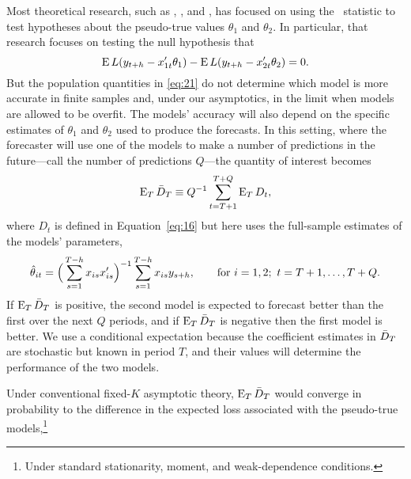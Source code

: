 \documentclass[11pt]{article}
\begin{document}
Most theoretical research, such as \citet{DiM:95}, \citet{Wes:96},
and \cite{Mcc:07}, has focused on using the \oost\ statistic to test
hypotheses about the pseudo-true values $\theta_1$ and $\theta_2$.  In
particular, that research focuses on testing the null hypothesis that
\begin{equation}\label{eq:21}
  \operatorname{E} L(y_{t+h} - x_{1t}'\theta_{1}) - \operatorname{E} L(y_{t+h} - x_{2t}'\theta_{2}) = 0.
\end{equation}
But the population quantities in \eqref{eq:21} do not determine which
model is more accurate in finite samples and, under our asymptotics,
in the limit when models are allowed to be overfit. The models'
accuracy will also depend on the specific estimates of $\theta_1$ and
$\theta_2$ used to produce the forecasts. In this setting, where the
forecaster will use one of the models to make a number of predictions
in the future---call the number of predictions $Q$---the quantity of
interest becomes
\begin{equation}
  \operatorname{E}_T \bar{D}_{T} \equiv Q^{-1} \sum_{t=T+1}^{T+Q} \operatorname{E}_T D_t,
\end{equation}
where $D_t$ is defined in Equation~\eqref{eq:16} but here uses the
full-sample estimates of the models' parameters,
\begin{equation}
  \hat\theta_{it} = \Big(\sum_{s=1}^{T-h} x_{is}x_{is}'\Big)^{-1} \sum_{s=1}^{T-h}
  x_{is} y_{s+h}, \qquad \text{for } i=1,2;\ t = T+1,\dots, T + Q.
\end{equation}
If $\operatorname{E}_T \bar{D}_{T}$ is positive, the second model is expected to forecast
better than the first over the next $Q$ periods, and if $\operatorname{E}_T \bar{D}_{T}$
is negative then the first model is better. We use a conditional
expectation because the coefficient estimates in $\bar{D}_{T}$ are
stochastic but known in period $T$, and their values will determine
the performance of the two models.

Under conventional fixed-$K$ asymptotic theory, $\operatorname{E}_T \bar{D}_{T}$ would
converge in probability to the difference in the expected loss
associated with the pseudo-true models,\footnote{Under standard
  stationarity, moment, and weak-dependence conditions.}
\end{document}

